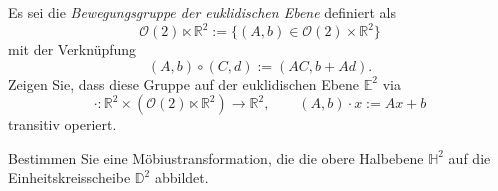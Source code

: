 \documentclass[11pt]{book}
\numberwithin{dummy}{section}
\theoremstyle{nonumberbreak}
\newenvironment{prob}[1][]{\ifthenelse{\equal{#1}{}}{\problem}{\problem[#1]}\rm}{\endproblem}
\newenvironment{sol}[1][]{\ifthenelse{\equal{#1}{}}{\solution}{\solution[#1]}\rm}{\endsolution}
\newcommand{\E}{\mathbb{E}}
\newcommand{\R}{\mathbb{R}}
\newcommand{\He}{\mathbb{H}}
\newcommand{\D}{\mathbb{D}}
\newcommand{\la}{\longrightarrow}
\begin{document}
\begin{spacing}{1.4}
\begin{prob}
\begin{sol}
\end{sol}

\end{prob}





\begin{prob}   %
\begin{compactenum}
\item Es sei die \textit{Bewegungsgruppe der euklidischen Ebene} definiert als 
$$\mathcal{O}(2) \ltimes \R^2 := \{(A,b) \in \mathcal{O}(2) \times \R^2\}$$
mit der Verknüpfung
$$(A,b) \circ (C,d) := (AC,b+Ad).$$
Zeigen Sie, dass diese Gruppe auf der euklidischen Ebene $\E^2$ via 
$$\cdot: \R^2 \times (\mathcal{O}(2) \ltimes \R^2) \la \R^2, \qquad (A,b) \cdot x := Ax+b$$
transitiv operiert.

\item Bestimmen Sie eine Möbiustransformation, die die obere Halbebene $\He^2$ auf die Einheitskreisscheibe $\D^2$ abbildet.
\end{compactenum}


\end{prob}
\end{spacing}
\end{document}
